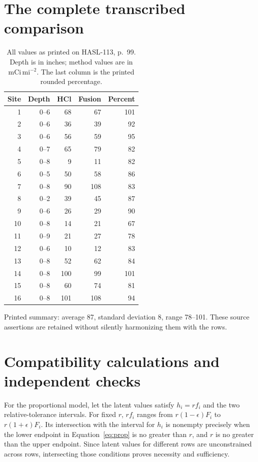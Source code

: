 \documentclass[11pt,a4paper]{article}
\newcommand{\unit}{\ensuremath{\mathrm{mCi}\,\mathrm{mi}^{-2}}}
\begin{document}
\appendix
\section{The complete transcribed comparison}
\begin{table}[h]
\centering\small
\caption{All values as printed on HASL-113, p.~99. Depth is in inches; method values are in \unit. The last column is the printed rounded percentage.}
\begin{tabular}{rrrrr}\toprule
Site & Depth & HCl & Fusion & Percent\\\midrule
1&0--6&68&67&101\\2&0--6&36&39&92\\3&0--6&56&59&95\\4&0--7&65&79&82\\5&0--8&9&11&82\\6&0--5&50&58&86\\7&0--8&90&108&83\\8&0--2&39&45&87\\9&0--6&26&29&90\\10&0--8&14&21&67\\11&0--9&21&27&78\\12&0--6&10&12&83\\13&0--8&52&62&84\\14&0--8&100&99&101\\15&0--8&60&74&81\\16&0--8&101&108&94\\\bottomrule
\end{tabular}
\end{table}
\noindent Printed summary: average 87, standard deviation 8, range 78--101. These source assertions are retained without silently harmonizing them with the rows.

\section{Compatibility calculations and independent checks}
For the proportional model, let the latent values satisfy $h_i=rf_i$ and the two relative-tolerance intervals. For fixed $r$, $rf_i$ ranges from $r(1-\epsilon)F_i$ to $r(1+\epsilon)F_i$. Its intersection with the interval for $h_i$ is nonempty precisely when the lower endpoint in Equation~\ref{eq:prop} is no greater than $r$, and $r$ is no greater than the upper endpoint. Since latent values for different rows are unconstrained across rows, intersecting those conditions proves necessity and sufficiency.
\end{document}
